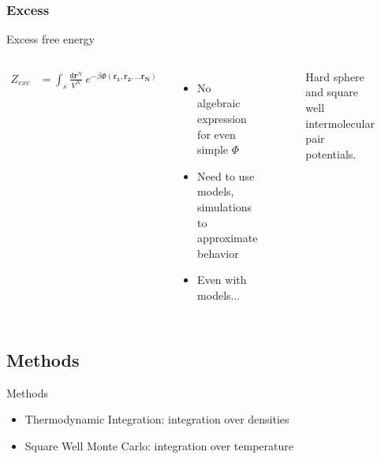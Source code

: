 \documentclass{beamer}
\newcommand*{\diff}{\mathsf{d}}
\renewcommand{\vec}[1]{\mathbf{#1}}
\begin{document}
\subsubsection*{Excess}
\begin{frame}{Excess free energy}	
	\begin{columns}[t]
	\setlength\abovedisplayskip{-2pt} 
	\begin{align*}
		Z_{exc} &= \int_s \frac{\diff\mathbf{r}^N}{V^N} ~e^{-\beta \Phi(\mathbf{r_1}, \mathbf{r_2}, \dots \mathbf{r_N})}
	\end{align*}
	\begin{itemize}
		\item No algebraic expression for even simple $\Phi$
		\item Need to use models, simulations to approximate behavior
		\item Even with models...
	\end{itemize}
	\begin{figure}
		\caption{Hard sphere and square well intermolecular pair potentials.}
	\end{figure}
	\end{columns}
\end{frame}


\subsection*{Methods}
\begin{frame}{Methods}
	\begin{figure}
	\end{figure}
	\begin{itemize}
		\item Thermodynamic Integration: integration over densities
		\item Square Well Monte Carlo: integration over temperature
	\end{itemize}
\end{frame}
\end{document}
